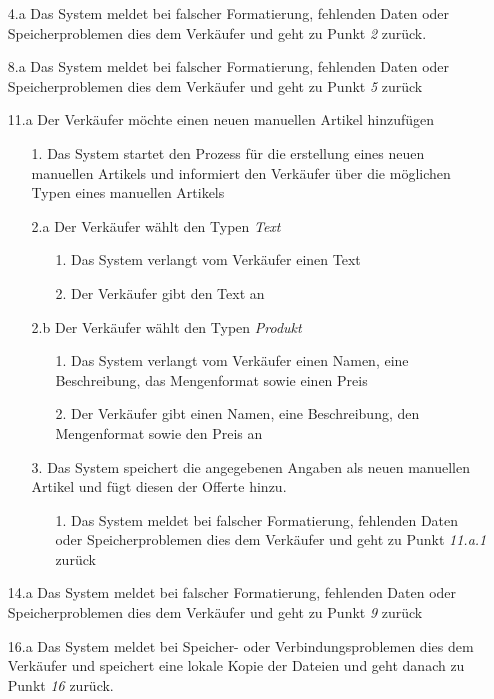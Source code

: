 \documentclass[journal]{combine}
\begin{document}
\begin{description}
\begin{enumerate}
			\item [4.a] Das System meldet bei falscher Formatierung, fehlenden Daten
			oder Speicherproblemen dies dem Verkäufer und geht zu Punkt \emph{2} zurück.
			\item [8.a] Das System meldet bei falscher Formatierung, fehlenden Daten
			oder Speicherproblemen dies dem Verkäufer und geht zu Punkt \emph{5} zurück
			\item [11.a] Der Verkäufer möchte einen neuen manuellen Artikel hinzufügen
			\begin{enumerate}
				\item[1.] Das System startet den Prozess für die erstellung eines neuen manuellen Artikels
				und informiert den Verkäufer über die möglichen Typen eines manuellen Artikels
				\item[2.a] Der Verkäufer wählt den Typen \emph{Text}
				\begin{enumerate}
					\item[1.] Das System verlangt vom Verkäufer einen Text
					\item[2.] Der Verkäufer gibt den Text an
				\end{enumerate}
				\item[2.b] Der Verkäufer wählt den Typen \emph{Produkt}
				\begin{enumerate}
					\item[1.] Das System verlangt vom Verkäufer einen Namen, eine Beschreibung,
					das Mengenformat sowie einen Preis
					\item[2.] Der Verkäufer gibt einen Namen, eine Beschreibung, den Mengenformat
					sowie den Preis an
				\end{enumerate} 
				\item[3.] Das System speichert die angegebenen Angaben als neuen manuellen Artikel
				und fügt diesen der Offerte hinzu.
				\begin{enumerate}
					\item [1.] Das System meldet bei falscher Formatierung, fehlenden Daten
					oder Speicherproblemen dies dem Verkäufer und geht zu Punkt \emph{11.a.1} zurück
				\end{enumerate} 
			\end{enumerate}
			\item [14.a] Das System meldet bei falscher Formatierung, fehlenden Daten
			oder Speicherproblemen dies dem Verkäufer und geht zu Punkt \emph{9} zurück
			\item [16.a] Das System meldet bei Speicher-  oder Verbindungsproblemen
			dies dem Verkäufer und speichert eine lokale Kopie der Dateien und geht danach
			zu Punkt \emph{16} zurück.
		\end{enumerate}
	\end{description}
	
\end{document}
